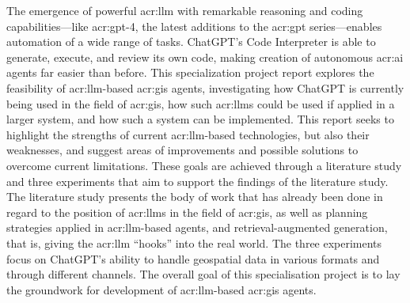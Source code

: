 The emergence of powerful \gls{acr:llm} with remarkable reasoning and coding capabilities---like \acrshort{acr:gpt}-4, the latest additions to the \acrshort{acr:gpt} series---enables automation of a wide range of tasks. ChatGPT's Code Interpreter is able to generate, execute, and review its own code, making creation of autonomous \acrshort{acr:ai} agents far easier than before. This specialization project report explores the feasibility of \gls{acr:llm}-based \acrshort{acr:gis} agents, investigating how ChatGPT is currently being used in the field of \acrshort{acr:gis}, how such \glspl{acr:llm} could be used if applied in a larger system, and how such a system can be implemented. This report seeks to highlight the strengths of current \gls{acr:llm}-based technologies, but also their weaknesses, and suggest areas of improvements and possible solutions to overcome current limitations. These goals are achieved through a literature study and three experiments that aim to support the findings of the literature study. The literature study presents the body of work that has already been done in regard to the position of \glspl{acr:llm} in the field of \acrshort{acr:gis}, as well as planning strategies applied in \gls{acr:llm}-based agents, and retrieval-augmented generation, that is, giving the \gls{acr:llm} \enquote{hooks} into the real world. The three experiments focus on ChatGPT's ability to handle geospatial data in various formats and through different channels. The overall goal of this specialisation project is to lay the groundwork for development of \gls{acr:llm}-based \acrshort{acr:gis} agents.

\glsresetall
